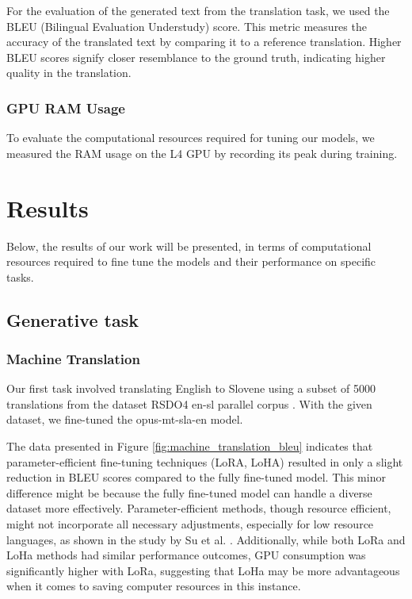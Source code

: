 \documentclass[fleqn,moreauthors,10pt]{ds_report}
\begin{document}
    For the evaluation of the generated text from the translation task, we used the BLEU (Bilingual Evaluation Understudy) score. This metric measures the accuracy of the translated text by comparing it to a reference translation. Higher BLEU scores signify closer resemblance to the ground truth, indicating higher quality in the translation.

    \subsubsection*{GPU RAM Usage}

    To evaluate the computational resources required for tuning our models, we measured the RAM usage on the L4 GPU by recording its peak during training.

\section*{Results}
Below, the results of our work will be presented, in terms of computational resources required to fine tune the models and their performance on specific tasks.

\subsection*{Generative task}

\subsubsection*{Machine Translation}

Our first task involved translating English to Slovene using a subset of 5000 translations from the dataset RSDO4 en-sl parallel corpus \cite{huggingfaceCjvtrsdo4_en_slDatasets}. With the given dataset, we fine-tuned the opus-mt-sla-en model. 

The data presented in Figure \ref{fig:machine_translation_bleu} indicates that parameter-efficient fine-tuning techniques (LoRA, LoHA) resulted in only a slight reduction in BLEU scores compared to the fully fine-tuned model. This minor difference might be because the fully fine-tuned model can handle a diverse dataset more effectively. Parameter-efficient methods, though resource efficient, might not incorporate all necessary adjustments, especially for low resource languages, as shown in the study by Su et al. \cite{su2024unlocking}. Additionally, while both LoRa and LoHa methods had similar performance outcomes, GPU consumption was significantly higher with LoRa, suggesting that LoHa may be more advantageous when it comes to saving computer resources in this instance.
\end{document}
